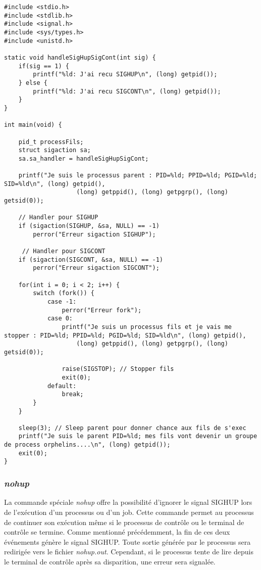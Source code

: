\begin{lstlisting}[caption={sighupOrphelins.c}, label={sighupOrphelins.c}]
#include <stdio.h>
#include <stdlib.h>
#include <signal.h>
#include <sys/types.h>
#include <unistd.h>

static void handleSigHupSigCont(int sig) {
    if(sig == 1) {
        printf("%ld: J'ai recu SIGHUP\n", (long) getpid());
    } else {
        printf("%ld: J'ai recu SIGCONT\n", (long) getpid());
    }
}

int main(void) {

    pid_t processFils;
    struct sigaction sa;
    sa.sa_handler = handleSigHupSigCont;

    printf("Je suis le processus parent : PID=%ld; PPID=%ld; PGID=%ld; SID=%ld\n", (long) getpid(),
                    (long) getppid(), (long) getpgrp(), (long) getsid(0));

    // Handler pour SIGHUP
    if (sigaction(SIGHUP, &sa, NULL) == -1)
        perror("Erreur sigaction SIGHUP");

     // Handler pour SIGCONT
    if (sigaction(SIGCONT, &sa, NULL) == -1)
        perror("Erreur sigaction SIGCONT");

    for(int i = 0; i < 2; i++) {
        switch (fork()) {
            case -1:
                perror("Erreur fork");
            case 0:
                printf("Je suis un processus fils et je vais me stopper : PID=%ld; PPID=%ld; PGID=%ld; SID=%ld\n", (long) getpid(),
                    (long) getppid(), (long) getpgrp(), (long) getsid(0));

                raise(SIGSTOP); // Stopper fils
                exit(0);
            default:
                break;
        }
    }

    sleep(3); // Sleep parent pour donner chance aux fils de s'exec
    printf("Je suis le parent PID=%ld; mes fils vont devenir un groupe de process orphelins....\n", (long) getpid());
    exit(0);
}
\end{lstlisting}

\subsubsection{\textit{nohup}}

La commande spéciale \textit{nohup} offre la possibilité d'ignorer le signal SIGHUP lors de l'exécution d'un processus ou d'un job. Cette commande permet au processus de 
continuer son exécution même si le processus de contrôle ou le terminal de contrôle se termine. Comme mentionné précédemment, la fin de ces deux événements génère le signal SIGHUP. 
Toute sortie générée par le processus sera redirigée vers le fichier \textit{nohup.out}. Cependant, si le processus tente de lire depuis le terminal de contrôle après sa disparition, une erreur sera signalée.

